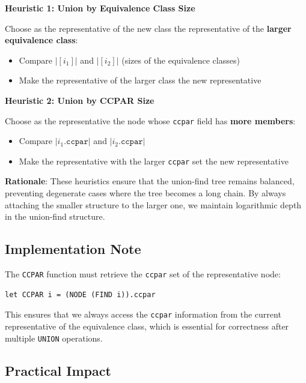 \documentclass[11pt,a4paper]{article}
\theoremstyle{definition}
\theoremstyle{plain}
\theoremstyle{remark}
\begin{document}
\begin{tcolorbox}[colback=purple!5!white,colframe=purple!75!black,title=\textbf{Union Heuristics}]
\textbf{Heuristic 1: Union by Equivalence Class Size}

Choose as the representative of the new class the representative of the \textbf{larger equivalence class}:
\begin{itemize}
    \item Compare $|[i_1]|$ and $|[i_2]|$ (sizes of the equivalence classes)
    \item Make the representative of the larger class the new representative
\end{itemize}

\textbf{Heuristic 2: Union by CCPAR Size}

Choose as the representative the node whose \texttt{ccpar} field has \textbf{more members}:
\begin{itemize}
    \item Compare $|i_1.\texttt{ccpar}|$ and $|i_2.\texttt{ccpar}|$
    \item Make the representative with the larger \texttt{ccpar} set the new representative
\end{itemize}
\end{tcolorbox}

\textbf{Rationale}: These heuristics ensure that the union-find tree remains balanced, preventing degenerate cases where the tree becomes a long chain. By always attaching the smaller structure to the larger one, we maintain logarithmic depth in the union-find structure.

\subsection{Implementation Note}

The \texttt{CCPAR} function must retrieve the \texttt{ccpar} set of the representative node:

\begin{verbatim}
let CCPAR i = (NODE (FIND i)).ccpar
\end{verbatim}

This ensures that we always access the \texttt{ccpar} information from the current representative of the equivalence class, which is essential for correctness after multiple \texttt{UNION} operations.

\subsection{Practical Impact}
\end{document}
